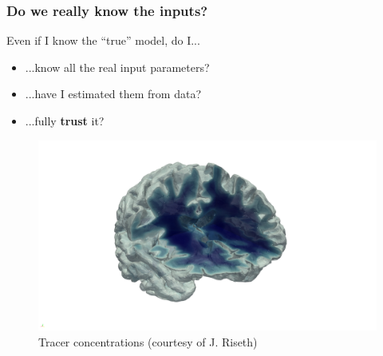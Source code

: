 \documentclass[aspectratio=169,xcolor=dvipsnames,10pt]{beamer}
\begin{document}
\begin{frame}\frametitle{Do we \alert{really} know the inputs?}
\begin{exampleblock}{}
\begin{minipage}{0.5\textwidth}
    Even if I know the ``true'' model, do I...
\begin{itemize}
\item ...know all the real input parameters?
\item ...have I estimated them from data? 
\item ...fully \textbf{trust} it?
\end{itemize}
\end{minipage}
\begin{minipage}{0.5\textwidth}
    \begin{figure}
        \centering
        \includegraphics[width=\textwidth,keepaspectratio]{Part I/figures/brain-mesh.png}
         \caption{\smaller Tracer concentrations (courtesy of J. Riseth)}
        \label{fig:enter-label}
    \end{figure}
\end{minipage}
\end{exampleblock}


\end{frame}
\end{document}
